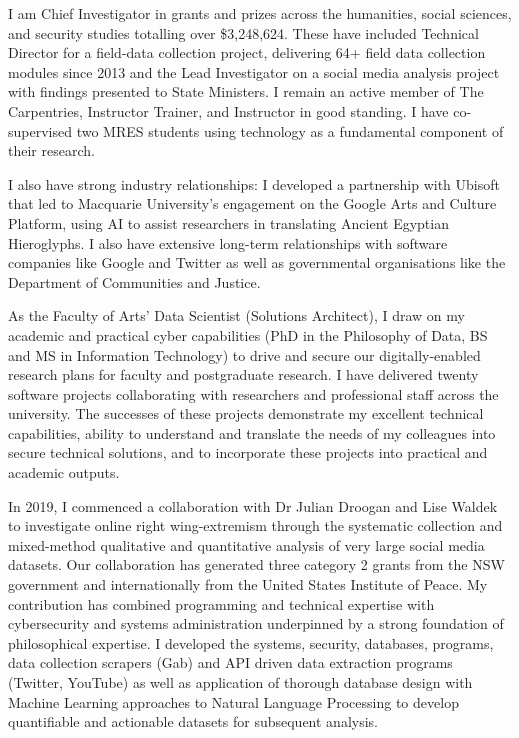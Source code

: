\documentclass[11pt, a4paper]{awesome-cv}
\begin{document}
\begin{cvletter}

I am Chief Investigator in grants and prizes across the humanities, social sciences, and security studies totalling over \$3,248,624. These have included Technical Director for a field-data collection project, delivering 64+ field data collection modules since 2013 and the Lead Investigator on a social media analysis project with findings presented to State Ministers. I remain an active member of The Carpentries, Instructor Trainer, and Instructor in good standing. I have co-supervised two MRES students using technology as a fundamental component of their research. 

I also have strong industry relationships: I developed a partnership with Ubisoft that led to Macquarie University's engagement on the Google Arts and Culture Platform, using AI to assist researchers in translating Ancient Egyptian Hieroglyphs. I also have extensive long-term relationships with software companies like Google and Twitter as well as governmental organisations like the Department of Communities and Justice. 

As the Faculty of Arts' Data Scientist (Solutions Architect), I draw on my academic and practical cyber capabilities (PhD in the Philosophy of Data, BS and MS in Information Technology) to drive and secure our digitally-enabled research plans for faculty and postgraduate research. I have delivered twenty software projects collaborating with researchers and professional staff across the university. The successes of these projects demonstrate my excellent technical capabilities, ability to understand and translate the needs of my colleagues into secure technical solutions, and to incorporate these projects into practical and academic outputs.


In 2019, I commenced a collaboration with Dr Julian Droogan and Lise Waldek to investigate online right wing-extremism through the systematic collection and mixed-method qualitative and quantitative analysis of very large social media datasets. Our collaboration has generated three category 2 grants from the NSW government and internationally from the United States Institute of Peace. My contribution has combined programming and technical expertise with cybersecurity and systems administration underpinned by a strong foundation of philosophical expertise. I developed the systems, security, databases, programs, data collection scrapers (Gab) and API driven data extraction programs (Twitter, YouTube) as well as application of thorough database design with Machine Learning approaches to Natural Language Processing to develop quantifiable and actionable datasets for subsequent analysis.


\end{cvletter}
\end{document}
